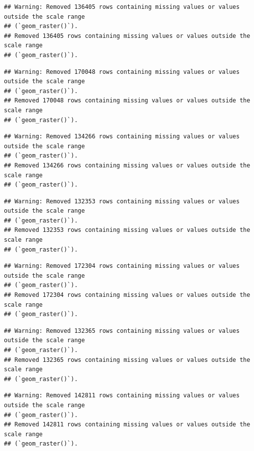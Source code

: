 \documentclass[
]{article}
\begin{document}
\begin{verbatim}
## Warning: Removed 136405 rows containing missing values or values outside the scale range
## (`geom_raster()`).
## Removed 136405 rows containing missing values or values outside the scale range
## (`geom_raster()`).
\end{verbatim}

\begin{verbatim}
## Warning: Removed 170048 rows containing missing values or values outside the scale range
## (`geom_raster()`).
## Removed 170048 rows containing missing values or values outside the scale range
## (`geom_raster()`).
\end{verbatim}

\begin{verbatim}
## Warning: Removed 134266 rows containing missing values or values outside the scale range
## (`geom_raster()`).
## Removed 134266 rows containing missing values or values outside the scale range
## (`geom_raster()`).
\end{verbatim}

\begin{verbatim}
## Warning: Removed 132353 rows containing missing values or values outside the scale range
## (`geom_raster()`).
## Removed 132353 rows containing missing values or values outside the scale range
## (`geom_raster()`).
\end{verbatim}

\begin{verbatim}
## Warning: Removed 172304 rows containing missing values or values outside the scale range
## (`geom_raster()`).
## Removed 172304 rows containing missing values or values outside the scale range
## (`geom_raster()`).
\end{verbatim}

\begin{verbatim}
## Warning: Removed 132365 rows containing missing values or values outside the scale range
## (`geom_raster()`).
## Removed 132365 rows containing missing values or values outside the scale range
## (`geom_raster()`).
\end{verbatim}

\begin{verbatim}
## Warning: Removed 142811 rows containing missing values or values outside the scale range
## (`geom_raster()`).
## Removed 142811 rows containing missing values or values outside the scale range
## (`geom_raster()`).
\end{verbatim}
\end{document}

